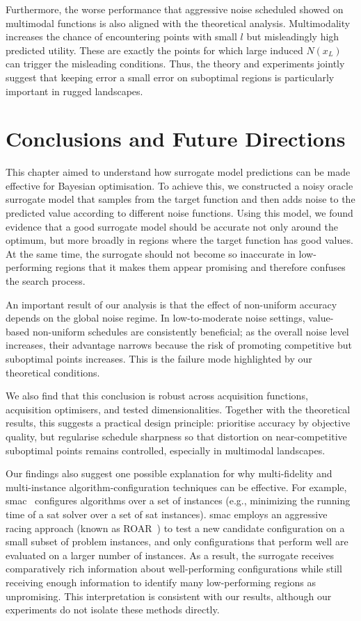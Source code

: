 Furthermore, the worse performance that aggressive noise scheduled showed on multimodal functions is also aligned with the theoretical analysis. Multimodality increases the chance of encountering points with small $l$ but misleadingly high predicted utility. These are exactly the points for which large induced $N(x_L)$ can trigger the misleading conditions. Thus, the theory and experiments jointly suggest that keeping error a small error on suboptimal regions is particularly important in rugged landscapes.
\section{Conclusions and Future Directions}
\label{sec:ch08:conclusion}

This chapter aimed to understand how surrogate model predictions can be made effective for Bayesian optimisation.
To achieve this, we constructed a noisy oracle surrogate model that samples from the target function and then adds noise to the predicted value according to different noise functions.
Using this model, we found evidence that a good surrogate model should be accurate not only around the optimum, but more broadly in regions where the target function has good values. At the same time, the surrogate should not become so inaccurate in low-performing regions that it makes them appear promising and therefore confuses the search process.

An important result of our analysis is that the effect of non-uniform accuracy depends on the global noise regime. In low-to-moderate noise settings, value-based non-uniform schedules are consistently beneficial; as the overall noise level increases, their advantage narrows because the risk of promoting competitive but suboptimal points increases. This is the failure mode highlighted by our theoretical conditions.

We also find that this conclusion is robust across acquisition functions, acquisition optimisers, and tested dimensionalities. Together with the theoretical results, this suggests a practical design principle: prioritise accuracy by objective quality, but regularise schedule sharpness so that distortion on near-competitive suboptimal points remains controlled, especially in multimodal landscapes.

Our findings also suggest one possible explanation for why multi-fidelity and multi-instance algorithm-configuration techniques can be effective. For example, \gls{smac}~\citep{HutEtAl11} configures algorithms over a set of instances (e.g., minimizing the running time of a \gls{sat} solver over a set of \gls{sat} instances). \gls{smac} employs an aggressive racing approach (known as ROAR~\citep{HutEtAl11}) to test a new candidate configuration on a small subset of problem instances, and only configurations that perform well are evaluated on a larger number of instances. As a result, the surrogate receives comparatively rich information about well-performing configurations while still receiving enough information to identify many low-performing regions as unpromising. This interpretation is consistent with our results, although our experiments do not isolate these methods directly.

